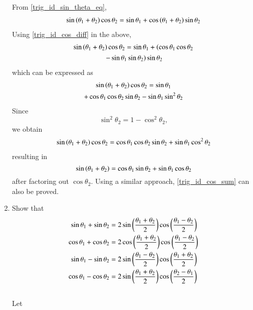 \begin{enumerate}[label=\thesection.\arabic*.,ref=\thesection.\theenumi]
%
\solution From \eqref{trig_id_sin_theta_eq},
%
\begin{align}
 \sin \left(\theta_1 + \theta_2\right)\cos \theta_2 =\sin  \theta_1 +\cos\left(\theta_1+\theta_2\right)\sin\theta_2 
\end{align}
%
Using \eqref{trig_id_cos_diff} in the above,
%
\begin{multline}
\sin \left(\theta_1 + \theta_2\right)\cos \theta_2 
=\sin  \theta_1 +\left(\cos \theta_1\cos\theta_2 \right.
\\	
\left.	- \sin \theta_1\sin\theta_2\right)\sin\theta_2 
\end{multline}
%
which can be expressed as
%
\begin{multline}
\sin \left(\theta_1 + \theta_2\right)\cos \theta_2 
=\sin  \theta_1 
\\
+\cos \theta_1\cos\theta_2 \sin\theta_2 
		- \sin \theta_1\sin^2\theta_2
\end{multline}
%
Since
%
\begin{equation}
\sin^2\theta_2 = 1- \cos^2\theta_2, 
\end{equation}
%
we obtain
%
\begin{multline}
\sin \left(\theta_1 + \theta_2\right)\cos \theta_2 
=\cos \theta_1\cos\theta_2 \sin\theta_2 
+ \sin \theta_1\cos^2\theta_2
\end{multline}
%
resulting in
%
\begin{equation}
\sin \left(\theta_1 + \theta_2\right)
=\cos \theta_1 \sin\theta_2 
+ \sin \theta_1\cos\theta_2
\end{equation}
%
after factoring out $\cos \theta_2$.  Using a similar approach, \eqref{trig_id_cos_sum} can also be proved.
\item Show that 
\begin{align}
\label{eq:trig_id_sum_diff1}
\sin \theta_1 + \sin \theta_2 &= 2\sin\left(\frac{\theta_1+\theta_2}{2}\right)\cos\left(\frac{\theta_1-\theta_2}{2}\right)
\\
\label{eq:trig_id_sum_diff2}
\cos \theta_1 + \cos \theta_2 &= 2\cos\left(\frac{\theta_1+\theta_2}{2}\right)\cos\left(\frac{\theta_1-\theta_2}{2}\right)
\\
\label{eq:trig_id_sum_diff3}
\sin \theta_1 - \sin \theta_2 &= 2\sin\left(\frac{\theta_1-\theta_2}{2}\right)\cos\left(\frac{\theta_1+\theta_2}{2}\right)
\\
\label{eq:trig_id_sum_diff4}
\cos \theta_1 - \cos \theta_2 &= 2\sin\left(\frac{\theta_1+\theta_2}{2}\right)\cos\left(\frac{\theta_2-\theta_1}{2}\right)
\end{align}
%
\\
\solution Let 
%
\begin{align}

\end{align}
\end{enumerate}
